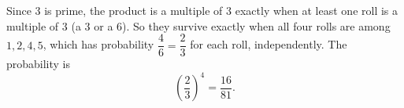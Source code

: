 Since $3$ is prime, the product is a multiple of $3$ exactly when at least one roll is a multiple of $3$ (a $3$ or a $6$). So they survive exactly when all four rolls are among $1,2,4,5$, which has probability $\dfrac{4}{6}=\dfrac{2}{3}$ for each roll, independently. The probability is
\[
\left(\dfrac{2}{3}\right)^4=\boxed{\dfrac{16}{81}}.
\]
